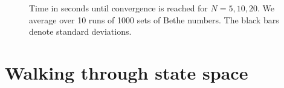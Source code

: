 \documentclass[11pt, a4paper]{report} %
\begin{document}
\begin{figure}[ph]
  \centering
  \\
  \\
  \caption{Time in seconds until convergence is reached for \(N=5,10,20\). We average over 10 runs of 1000 sets of Bethe numbers. The black bars denote standard deviations.}
  \label{fig:convtimes}
\end{figure}

\section{Walking through state space}
\end{document}
